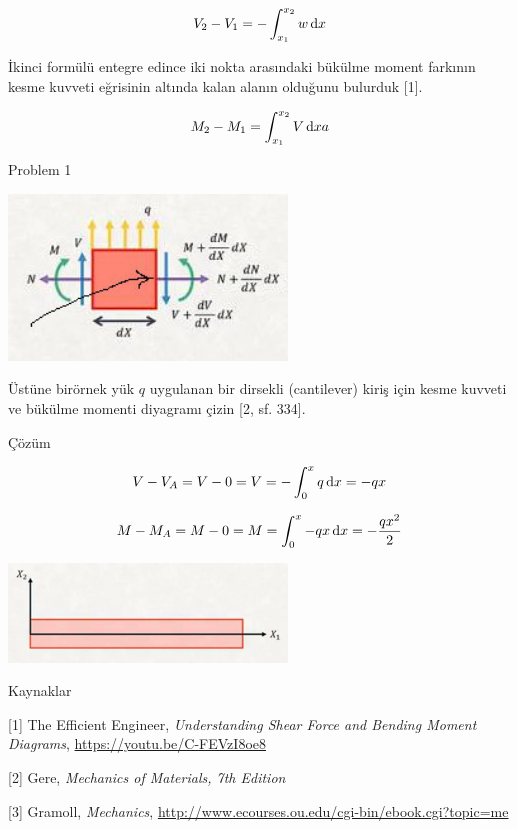 \documentclass[12pt,fleqn]{article}\usepackage{../../common}
\begin{document}
$$
V_2 - V_1 = - \int_{x_1}^{x_2} w \,\mathrm{d} x
$$

İkinci formülü entegre edince iki nokta arasındaki bükülme moment farkının kesme
kuvveti eğrisinin altında kalan alanın olduğunu bulurduk [1].

$$
M_2 - M_1 = \int_{x_1}^{x_2} V \,\mathrm{d} xa
$$







Problem 1

\includegraphics[width=20em]{phy_020_strs_02_11.jpg}

Üstüne birörnek yük $q$ uygulanan bir dirsekli (cantilever) kiriş için kesme
kuvveti ve bükülme momenti diyagramı çizin [2, sf. 334].

Çözüm

$$
V - V_A = V - 0 = V = -\int_{0}^{x} q \,\mathrm{d} x = -qx
$$

$$
M - M_A = M - 0 = M = \int_{0}^{x} -qx \,\mathrm{d} x = -\frac{qx^2}{2}
$$

\includegraphics[width=20em]{phy_020_strs_02_12.jpg}

Kaynaklar 

[1] The Efficient Engineer, {\em Understanding Shear Force and Bending Moment Diagrams},
    \url{https://youtu.be/C-FEVzI8oe8}

[2] Gere, {\em Mechanics of Materials, 7th Edition}

[3] Gramoll, {\em Mechanics},
    \url{http://www.ecourses.ou.edu/cgi-bin/ebook.cgi?topic=me}
\end{document}

